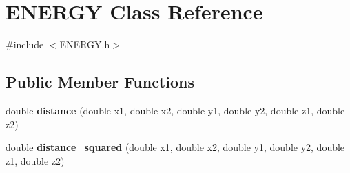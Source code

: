 \hypertarget{classENERGY}{
\section{ENERGY Class Reference}
\label{classENERGY}
}


{\ttfamily \#include $<$ENERGY.h$>$}\subsection*{Public Member Functions}
\begin{DoxyCompactItemize}
\item 
\hypertarget{classENERGY_ac7870a394c7fad5207160d6c79da9ee6}{
double {\bfseries distance} (double x1, double x2, double y1, double y2, double z1, double z2)}
\label{classENERGY_ac7870a394c7fad5207160d6c79da9ee6}

\item 
\hypertarget{classENERGY_a3e62d5e4d58e5cc8e28960fd376ef1c5}{
double {\bfseries distance\_\-squared} (double x1, double x2, double y1, double y2, double z1, double z2)}
\label{classENERGY_a3e62d5e4d58e5cc8e28960fd376ef1c5}


\end{DoxyCompactItemize}

